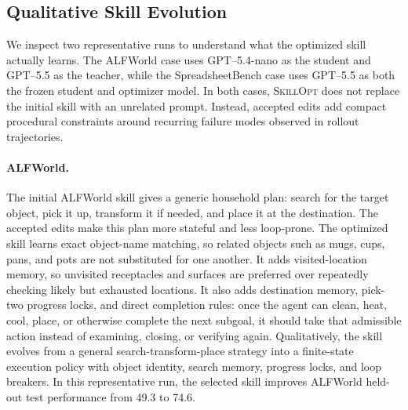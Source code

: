 \documentclass{llmxive}
\providecommand{\ourmethod}{\textsc{SkillOpt}\xspace}
\begin{document}
\subsection{Qualitative Skill Evolution}
\label{sec:qualitative_skill_evolution}

We inspect two representative runs to understand what the optimized skill actually learns. The ALFWorld case uses GPT--5.4-nano as the student and GPT--5.5 as the teacher, while the SpreadsheetBench case uses GPT--5.5 as both the frozen student and optimizer model. In both cases, \ourmethod{} does not replace the initial skill with an unrelated prompt. Instead, accepted edits add compact procedural constraints around recurring failure modes observed in rollout trajectories.

\paragraph{ALFWorld.}
The initial ALFWorld skill gives a generic household plan: search for the target object, pick it up, transform it if needed, and place it at the destination. The accepted edits make this plan more stateful and less loop-prone. The optimized skill learns exact object-name matching, so related objects such as mugs, cups, pans, and pots are not substituted for one another. It adds visited-location memory, so unvisited receptacles and surfaces are preferred over repeatedly checking likely but exhausted locations. It also adds destination memory, pick-two progress locks, and direct completion rules: once the agent can clean, heat, cool, place, or otherwise complete the next subgoal, it should take that admissible action instead of examining, closing, or verifying again. Qualitatively, the skill evolves from a general search-transform-place strategy into a finite-state execution policy with object identity, search memory, progress locks, and loop breakers. In this representative run, the selected skill improves ALFWorld held-out test performance from 49.3 to 74.6.
\end{document}
